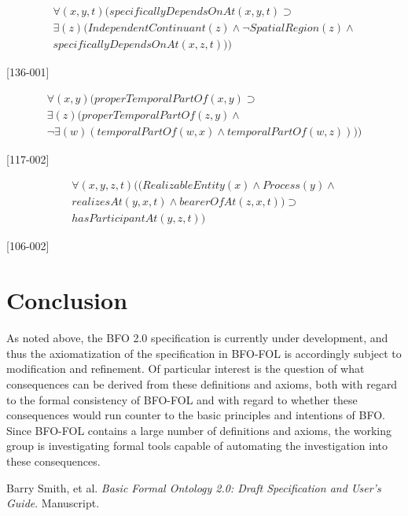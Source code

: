 \documentclass{article}
\begin{document}
\begin{flushright}
[104-001] 

\begin{equation}
\begin{split}
{\forall}(x, y, t)(specificallyDependsOnAt(x, y, t) \supset \\
{\exists}(z)(IndependentContinuant(z) \wedge {\neg}SpatialRegion(z) \wedge \\
specificallyDependsOnAt(x, z, t)))
\end{split}
\end{equation}

[136-001] 

\begin{equation}
\begin{split}
{\forall}(x, y)(properTemporalPartOf(x, y) \supset \\
{\exists}(z)(properTemporalPartOf(z, y) \wedge \\
{\neg}{\exists}(w)(temporalPartOf(w, x) \wedge temporalPartOf(w, z))))
\end{split}
\end{equation}

[117-002] 

\begin{equation}
\begin{split}
{\forall}(x, y, z, t)((RealizableEntity(x) \wedge Process(y) \wedge \\
realizesAt(y, x, t) \wedge bearerOfAt(z, x, t)) \supset \\
hasParticipantAt(y, z, t))
\end{split}
\end{equation}

[106-002] 


\end{flushright}

\section{Conclusion}

As noted above, the BFO 2.0 specification is currently under development, and thus the axiomatization of the specification in BFO-FOL is accordingly subject to modification and refinement.  Of particular interest is the question of what consequences can be derived from these definitions and axioms, both with regard to the formal consistency of BFO-FOL and with regard to whether these consequences would run counter to the basic principles and intentions of BFO.  Since BFO-FOL contains a large number of definitions and axioms, the working group is investigating formal tools capable of automating the investigation into these consequences.

\begin{thebibliography}{99}

Barry Smith, et al. \emph{Basic Formal Ontology 2.0: Draft Specification and User's Guide}.  Manuscript.
\end{thebibliography}
\end{document}
